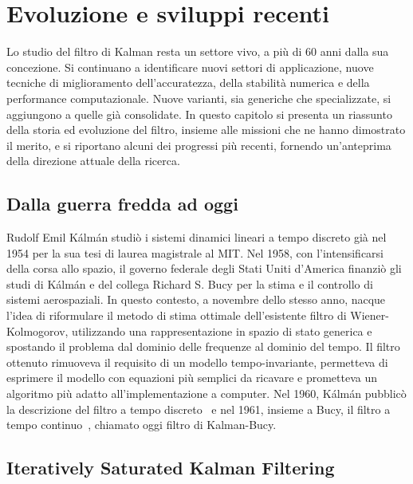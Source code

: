 \documentclass[12pt,a4paper,openright,twoside]{book}
\begin{document}

\chapter{Evoluzione e sviluppi recenti}

Lo studio del filtro di Kalman resta un settore vivo, a più di 60 anni dalla sua concezione. Si continuano a identificare nuovi settori di applicazione, nuove tecniche di miglioramento dell'accuratezza, della stabilità numerica e della performance computazionale. Nuove varianti, sia generiche che specializzate, si aggiungono a quelle già consolidate. In questo capitolo si presenta un riassunto della storia ed evoluzione del filtro, insieme alle missioni che ne hanno dimostrato il merito, e si riportano alcuni dei progressi più recenti, fornendo un'anteprima della direzione attuale della ricerca.

\section{Dalla guerra fredda ad oggi}

Rudolf Emil Kálmán studiò i sistemi dinamici lineari a tempo discreto già nel 1954 per la sua tesi di laurea magistrale al MIT. Nel 1958, con l'intensificarsi della corsa allo spazio, il governo federale degli Stati Uniti d'America finanziò gli studi di Kálmán e del collega Richard S. Bucy per la stima e il controllo di sistemi aerospaziali. In questo contesto, a novembre dello stesso anno, nacque l'idea di riformulare il metodo di stima ottimale dell'esistente filtro di Wiener-Kolmogorov, utilizzando una rappresentazione in spazio di stato generica e spostando il problema dal dominio delle frequenze al dominio del tempo. Il filtro ottenuto rimuoveva il requisito di un modello tempo-invariante, permetteva di esprimere il modello con equazioni più semplici da ricavare e prometteva un algoritmo più adatto all'implementazione a computer.
Nel 1960, Kálmán pubblicò la descrizione del filtro a tempo discreto~\cite{10.1115/1.3662552} e nel 1961, insieme a Bucy, il filtro a tempo continuo~\cite{10.1115/1.3658902}, chiamato oggi filtro di Kalman-Bucy.

\section{Iteratively Saturated Kalman Filtering}
\end{document}
